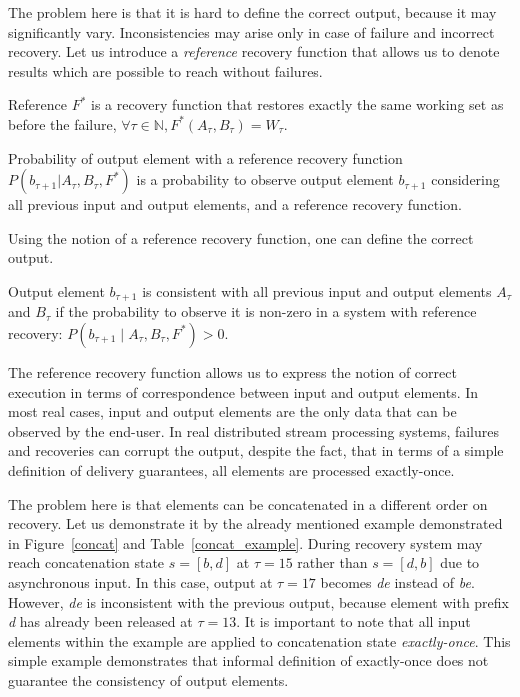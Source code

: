 The problem here is that it is hard to define the correct output, because it may significantly vary. Inconsistencies may arise only in case of failure and incorrect recovery. Let us introduce a {\em reference} recovery function that allows us to denote results which are possible to reach without failures.

\begin{definition}{Reference}
$F^{*}$ is a recovery function that restores exactly the same working set as before the failure, $\forall \tau \in \mathbb{N}, F^{*}(A_\tau,B_\tau)=W_\tau$.
\end{definition}

\begin{definition}{Probability of output element with a reference recovery function}
$P(b_{\tau+1}|A_{\tau}, B_\tau, F^{*})$ is a probability to observe output element $b_{\tau+1}$ considering all previous input and output elements, and a reference recovery function.
\end{definition}

Using the notion of a reference recovery function, one can define the correct output. 

\begin{definition}{Output element $b_{\tau+1}$ is consistent}
with all previous input and output elements $A_\tau$ and $B_\tau$ if the probability to observe it is non-zero in a system with reference recovery: $P(b_{\tau+1} \mid A_\tau,B_\tau,F^{*})>0$.
\end{definition}

The reference recovery function allows us to express the notion of correct execution in terms of correspondence between input and output elements. In most real cases, input and output elements are the only data that can be observed by the end-user. In real distributed stream processing systems, failures and recoveries can corrupt the output, despite the fact, that in terms of a simple definition of delivery guarantees, all elements are processed exactly-once. 

The problem here is that elements can be concatenated in a different order on recovery. Let us demonstrate it by the already mentioned example demonstrated in Figure~\ref{concat} and Table~\ref{concat_example}. During recovery system may reach concatenation state $s=[b,d]$ at $\tau=15$ rather than $s=[d,b]$ due to asynchronous input. In this case, output at $\tau=17$ becomes {\em de} instead of {\em be}. However, {\em de} is inconsistent with the previous output, because element with prefix {\em d} has already been released at $\tau=13$. It is important to note that all input elements within the example are applied to concatenation state {\em  exactly-once}. This simple example demonstrates that informal definition of exactly-once does not guarantee the consistency of output elements.

